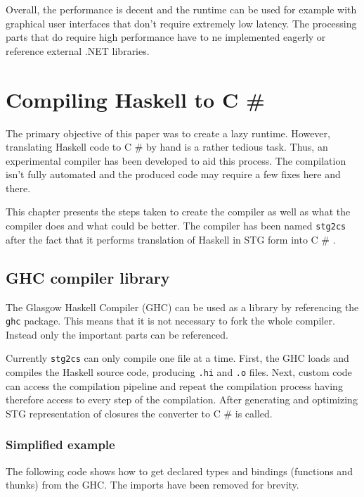 \documentclass[en]{pracamgr}
\newcommand{\shrp}{%
  {\fontfamily{ppl}\selectfont\#%
  }}
\begin{document}
Overall, the performance is decent and the runtime can be used
for example with graphical user interfaces that don't require
extremely low latency. The processing parts that do
require high performance have to ne implemented eagerly
or reference external .NET libraries.

\chapter{Compiling Haskell to C\shrp{}}\label{r:compiler}

The primary objective of this paper was to create a lazy runtime.
However, translating Haskell code to C\shrp{} by hand is a rather
tedious task. Thus, an experimental compiler has been developed
to aid this process. The compilation isn't fully automated and
the produced code may require a few fixes here and there.

This chapter presents the steps taken to create the compiler
as well as what the compiler does and what could be better.
The compiler has been named \texttt{stg2cs} after the fact
that it performs translation of Haskell in STG form into C\shrp{}.

\section{GHC compiler library}
The Glasgow Haskell Compiler (GHC) can be used as a library
by referencing the \texttt{ghc} package. This means that
it is not necessary to fork the whole compiler.
Instead only the important parts can be referenced.

Currently \texttt{stg2cs} can only compile one file at a time.
First, the GHC loads and compiles the Haskell source code,
producing \texttt{.hi} and \texttt{.o} files.
Next, custom code can access the compilation pipeline and
repeat the compilation process having therefore access to
every step of the compilation.
After generating and optimizing STG representation of closures
the converter to C\shrp{} is called.

\subsection{Simplified example}
The following code shows how to get declared types and bindings
(functions and thunks) from the GHC. The imports have been removed
for brevity.
\end{document}
